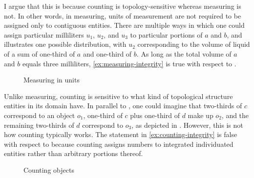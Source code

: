 I argue that this is because counting is topology-sensitive whereas measuring is not. In other words, in measuring, units of measurement are not required to be assigned only to contiguous entities. There are multiple ways in which one could assign particular milliliters $u_1$, $u_2$, and $u_3$ to particular portions of $a$ and $b$, and  illustrates one possible distribution, with $u_2$ corresponding to the volume of liquid of a sum of one-third of $a$ and one-third of $b$. As long as the total volume of $a$ and $b$ equals three milliliters, \ref{ex:measuring-integrity} is true with respect to .

\vfill
\begin{figure}[H]
	\centering
	\caption{Measuring in units}
	\label{fig:measuring-in-units}
\end{figure}
\vfill\pagebreak

Unlike measuring, counting is sensitive to what kind of topological structure entities in its domain have. In parallel to , one could imagine that two-thirds of $c$ correspond to an object $o_1$, one-third of $c$ plus one-third of $d$ make up $o_2$, and the remaining two-thirds of $d$ correspond to $o_3$, as depicted in . However, this is not how counting typically works. The statement in \ref{ex:counting-integrity} is false with respect to  because counting assigns numbers to integrated individuated entities rather than arbitrary portions thereof.

\begin{figure}[h!]
	\centering
	\caption{Counting objects}
	\label{fig:counting-objects}
\end{figure}

